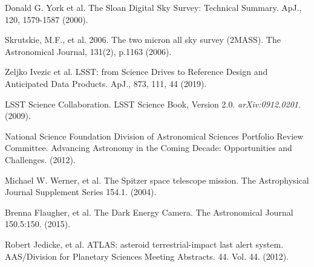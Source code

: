 
%
%
%


\begin{thebibliography}{50}

 Donald G. York et al. The Sloan Digital Sky Survey: Technical Summary. ApJ., 120, 1579-1587 (2000). 

 Skrutskie, M.F., et al. 2006. The two micron all sky survey (2MASS). The Astronomical Journal, 131(2), p.1163 (2006).

 Zeljko Ivezic et al. LSST: from Science Drives to Reference Design and Anticipated Data Products. ApJ., 873, 111, 44 (2019).

 LSST Science Collaboration. LSST Science Book, Version 2.0. {\it arXiv:0912.0201}. (2009).

 National Science Foundation Division of Astronomical Sciences Portfolio Review Committee. Advancing Astronomy in the Coming Decade: Opportunities and Challenges. (2012).

 Michael W. Werner, et al. The Spitzer space telescope mission. The Astrophysical Journal Supplement Series 154.1. (2004).

 Brenna Flaugher, et al. The Dark Energy Camera. The Astronomical Journal 150.5:150. (2015).

 Robert Jedicke, et al. ATLAS: asteroid terrestrial-impact last alert system. AAS/Division for Planetary Sciences Meeting Abstracts. 44. Vol. 44. (2012).



\end{thebibliography}
